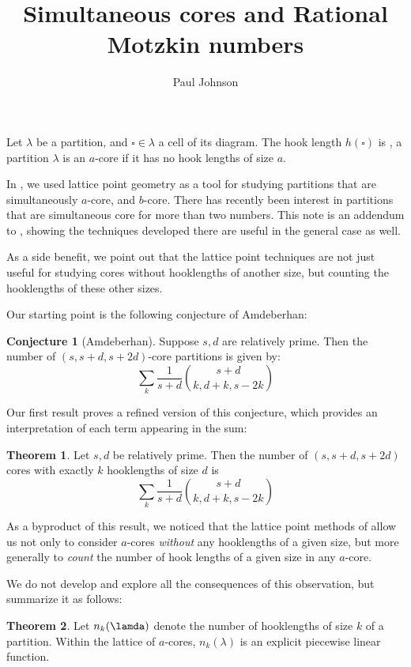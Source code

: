 \documentclass{amsart}
\title{Simultaneous cores and Rational Motzkin numbers}
\author{Paul Johnson}
\theoremstyle{definition}
\newtheorem{theorem}{Theorem}
\newtheorem{conjecture}{Conjecture}
\begin{document}
\maketitle
Let $\lambda$ be a partition, and $\square\in\lambda$ a cell of its diagram.
The hook length $h(\square)$ is , a partition $\lambda$ is an $a$-core if it has no hook lengths of size $a$.


In \cite{johnson}, we used lattice point geometry as a tool for studying partitions that are simultaneously $a$-core, and $b$-core.  There has recently been interest in partitions that are simultaneous core for more than two numbers.  This note is an addendum to \cite{johnson}, showing the techniques developed there are useful in the general case as well.  

As a side benefit, we point out that the lattice point techniques are not just useful for studying cores without hooklengths of another size, but counting the hooklengths of these other sizes.


Our starting point is the following conjecture of Amdeberhan:
\begin{conjecture}[Amdeberhan] \label{conj:Amdeberhan}
Suppose $s,d$ are relatively prime.
Then the number of $(s,s+d,s+2d)$-core partitions is given by:
$$\sum_k \frac{1}{s+d}\binom{s+d}{k,d+k,s-2k}$$
\end{conjecture}
Our first result proves a refined version of this conjecture, which provides an interpretation of each term appearing in the sum:

\begin{theorem} \label{thm:cores}
Let $s,d$ be relatively prime.  Then the number of $(s,s+d,s+2d)$ cores with exactly $k$ hooklengths of size $d$ is
$$\sum_k \frac{1}{s+d}\binom{s+d}{k,d+k,s-2k}$$
\end{theorem}

As a byproduct of this result, we noticed that the lattice point methods of \cite{johnson} allow us not only to consider $a$-cores \emph{without} any hooklengths of a given size, but more generally to \emph{count} the number of hook lengths of a given size in any $a$-core.  

We do not develop and explore all the consequences of this observation, but summarize it as follows:

\begin{theorem}
Let $n_k(\lamda)$ denote the number of hooklengths of size $k$ of a partition.
Within the lattice of $a$-cores, $n_k(\lambda)$ is an explicit piecewise linear function.
\end{theorem}
\end{document}

